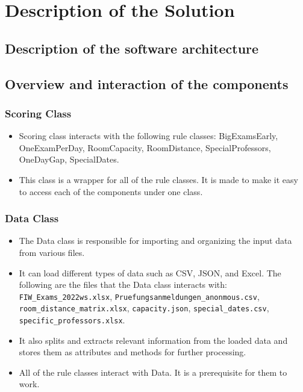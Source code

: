 \section{Description of the Solution}
\subsection{Description of the software architecture}


\subsection{Overview and interaction of the components}


\subsubsection{Scoring Class}


\begin{itemize}
\item Scoring class interacts with the following rule classes: BigExamsEarly, OneExamPerDay, RoomCapacity, RoomDistance, SpecialProfessors, OneDayGap, SpecialDates.
\item This class is a wrapper for all of the rule classes. It is made to make it easy to access each of the components under one class.
\end{itemize}


\subsubsection{Data Class}


\begin{itemize}
\item The Data class is responsible for importing and organizing the input data from various files.
\item It can load different types of data such as CSV, JSON, and Excel. The following are the files that the Data class interacts with: \texttt{FIW\_Exams\_2022ws.xlsx}, \texttt{Pruefungsanmeldungen\_anonmous.csv}, \texttt{room\_distance\_matrix.xlsx}, \texttt{capacity.json}, \texttt{special\_dates.csv}, \texttt{specific\_professors.xlsx}.
\item It also splits and extracts relevant information from the loaded data and stores them as attributes and methods for further processing.
\item All of the rule classes interact with Data. It is a prerequisite for them to work.
\end{itemize}


